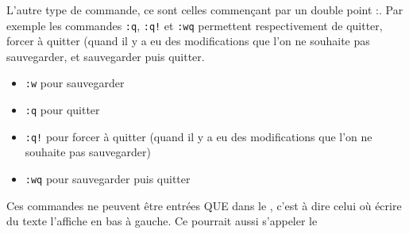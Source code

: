 \documentclass[a4paper,twoside]{article}
\begin{document}
L'autre type de commande, ce sont celles commençant par un double point \og :\fg. Par exemple les commandes \texttt{:q}, \texttt{:q!} et \texttt{:wq} permettent respectivement de quitter, forcer à quitter (quand il y a eu des modifications que l'on ne souhaite pas sauvegarder, et sauvegarder puis quitter.
\begin{itemize}
\item \texttt{:w} pour sauvegarder
\item \texttt{:q} pour quitter
\item \texttt{:q!} pour forcer à quitter (quand il y a eu des modifications que l'on ne souhaite pas sauvegarder)
\item \texttt{:wq} pour sauvegarder puis quitter
\end{itemize}

\begin{attention}
Ces commandes ne peuvent être entrées QUE dans le , c'est à dire celui où écrire du texte l'affiche en bas à gauche. Ce  pourrait aussi s'appeler le 
\end{attention}

\clearpage
\printindex
\end{document}
